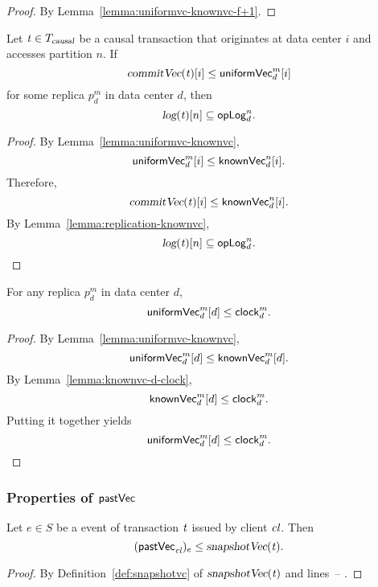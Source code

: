 \begin{proof} \label{proof:uniformvc-knownvc}
  By Lemma~\ref{lemma:uniformvc-knownvc-f+1}.
\end{proof}

\begin{applemma} \label{lemma:replication-uniformvc}
  Let $\mathit{t} \in T_{\textsl{causal}}$ be a causal transaction
  that originates at data center $i$
  and accesses partition $n$.
  If
  \[
    \textsl{commitVec}(\mathit{t})[i] \le {\sf uniformVec}^{m}_{d}[i]
  \]
  for some replica $p^{m}_{d}$ in data center $d$,
  then
  \[
    \textsl{log}(\mathit{t})[n] \subseteq {\sf opLog}^{n}_{d}.
  \]
\end{applemma}

\begin{proof} \label{proof:replication-uniformvc}
  By Lemma~\ref{lemma:uniformvc-knownvc},
  \[
    {\sf uniformVec}^{m}_{d}[i] \le {\sf knownVec}^{n}_{d}[i].
  \]
  Therefore,
  \[
    \textsl{commitVec}(\mathit{t})[i] \le {\sf knownVec}^{n}_{d}[i].
  \]
  By Lemma~\ref{lemma:replication-knownvc},
  \[
    \textsl{log}(\mathit{t})[n] \subseteq {\sf opLog}^{n}_{d}.
  \]
\end{proof}

\begin{applemma} \label{lemma:uniformvc-clock}
  For any replica $p^{m}_{d}$ in data center $d$,
  \[
    {\sf uniformVec}^{m}_{d}[d] \le {\sf clock}^{m}_{d}.
  \]
\end{applemma}

\begin{proof} \label{proof:uniformvc-clock}
  By Lemma~\ref{lemma:uniformvc-knownvc},
  \[
    {\sf uniformVec}^{m}_{d}[d] \le {\sf knownVec}^{m}_{d}[d].
  \]
  By Lemma~\ref{lemma:knownvc-d-clock},
  \[
    {\sf knownVec}^{m}_{d}[d] \le {\sf clock}^{m}_{d}.
  \]
  Putting it together yields
  \[
    {\sf uniformVec}^{m}_{d}[d] \le {\sf clock}^{m}_{d}.
  \]
\end{proof}
\subsubsection{Properties of ${\sf pastVec}$}
\label{sss:cvc}

\begin{applemma} \label{lemma:start-pastvc-snapshotvc}
  Let $e \in S$ be a \start{} event of transaction $\mathit{t}$
  issued by client $\mathit{cl}$. Then
  \[
    ({\sf pastVec}_{\mathit{cl}})_{e} \le \textsl{snapshotVec}(\mathit{t}).
  \]
\end{applemma}

\begin{proof} \label{proof:start-pastvc-snapshotvc}
  By Definition~\ref{def:snapshotvc} of $\textsl{snapshotVec}(\mathit{t})$
  and lines~\code{\ref{alg:unistore-coord}}{\ref{line:start-uniformvc-index}}--
  \code{\ref{alg:unistore-coord}}{\ref{line:start-snapvc-strong}}.
\end{proof}

